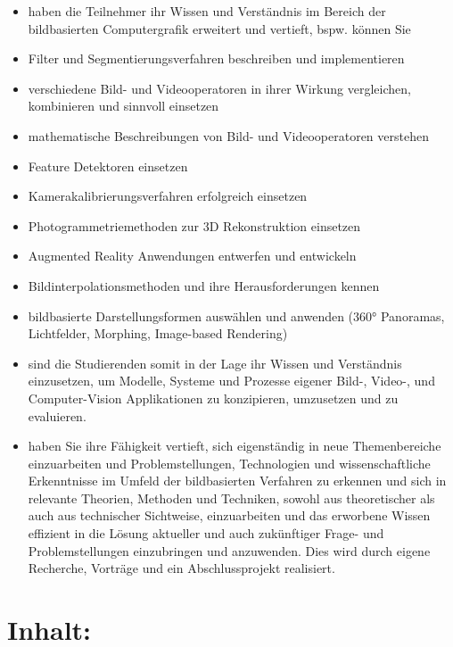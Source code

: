 \begin{itemize}
\tightlist
\item
  haben die Teilnehmer ihr Wissen und Verständnis im Bereich der
  bildbasierten Computergrafik erweitert und vertieft, bspw. können Sie
\item
  Filter und Segmentierungsverfahren beschreiben und implementieren
\item
  verschiedene Bild- und Videooperatoren in ihrer Wirkung vergleichen,
  kombinieren und sinnvoll einsetzen
\item
  mathematische Beschreibungen von Bild- und Videooperatoren verstehen
\item
  Feature Detektoren einsetzen
\item
  Kamerakalibrierungsverfahren erfolgreich einsetzen
\item
  Photogrammetriemethoden zur 3D Rekonstruktion einsetzen
\item
  Augmented Reality Anwendungen entwerfen und entwickeln
\item
  Bildinterpolationsmethoden und ihre Herausforderungen kennen
\item
  bildbasierte Darstellungsformen auswählen und anwenden (360°
  Panoramas, Lichtfelder, Morphing, Image-based Rendering)
\item
  sind die Studierenden somit in der Lage ihr Wissen und Verständnis
  einzusetzen, um Modelle, Systeme und Prozesse eigener Bild-, Video-,
  und Computer-Vision Applikationen zu konzipieren, umzusetzen und zu
  evaluieren.
\item
  haben Sie ihre Fähigkeit vertieft, sich eigenständig in neue
  Themenbereiche einzuarbeiten und Problemstellungen, Technologien und
  wissenschaftliche Erkenntnisse im Umfeld der bildbasierten Verfahren
  zu erkennen und sich in relevante Theorien, Methoden und Techniken,
  sowohl aus theoretischer als auch aus technischer Sichtweise,
  einzuarbeiten und das erworbene Wissen effizient in die Lösung
  aktueller und auch zukünftiger Frage- und Problemstellungen
  einzubringen und anzuwenden. Dies wird durch eigene Recherche,
  Vorträge und ein Abschlussprojekt realisiert.
\end{itemize}

\section*{Inhalt:}\label{inhalt-15}

